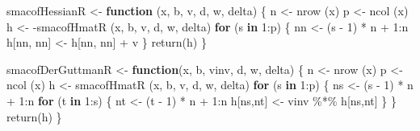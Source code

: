 \documentclass[
  12pt,
]{book}
\newenvironment{Shaded}{\begin{snugshade}}{\end{snugshade}}
\newcommand{\ControlFlowTok}[1]{\textcolor[rgb]{0.13,0.29,0.53}{\textbf{#1}}}
\newcommand{\DecValTok}[1]{\textcolor[rgb]{0.00,0.00,0.81}{#1}}
\newcommand{\FunctionTok}[1]{\textcolor[rgb]{0.00,0.00,0.00}{#1}}
\newcommand{\NormalTok}[1]{#1}
\newcommand{\OtherTok}[1]{\textcolor[rgb]{0.56,0.35,0.01}{#1}}
\newcommand{\SpecialCharTok}[1]{\textcolor[rgb]{0.00,0.00,0.00}{#1}}
\theoremstyle{definition}
\theoremstyle{definition}
\theoremstyle{definition}
\theoremstyle{definition}
\theoremstyle{remark}
\begin{document}
\begin{Shaded}
\begin{Highlighting}[]
\NormalTok{smacofHessianR }\OtherTok{\textless{}{-}} \ControlFlowTok{function}\NormalTok{ (x, b, v, d, w, delta) \{}
\NormalTok{  n }\OtherTok{\textless{}{-}} \FunctionTok{nrow}\NormalTok{ (x)}
\NormalTok{  p }\OtherTok{\textless{}{-}} \FunctionTok{ncol}\NormalTok{ (x)}
\NormalTok{  h }\OtherTok{\textless{}{-}} \SpecialCharTok{{-}}\FunctionTok{smacofHmatR}\NormalTok{ (x, b, v, d, w, delta)}
  \ControlFlowTok{for}\NormalTok{ (s }\ControlFlowTok{in} \DecValTok{1}\SpecialCharTok{:}\NormalTok{p) \{}
\NormalTok{    nn }\OtherTok{\textless{}{-}}\NormalTok{ (s }\SpecialCharTok{{-}} \DecValTok{1}\NormalTok{) }\SpecialCharTok{*}\NormalTok{ n }\SpecialCharTok{+} \DecValTok{1}\SpecialCharTok{:}\NormalTok{n}
\NormalTok{    h[nn, nn] }\OtherTok{\textless{}{-}}\NormalTok{ h[nn, nn] }\SpecialCharTok{+}\NormalTok{ v}
\NormalTok{  \}}
  \FunctionTok{return}\NormalTok{(h)}
\NormalTok{\}}

\NormalTok{smacofDerGuttmanR }\OtherTok{\textless{}{-}} \ControlFlowTok{function}\NormalTok{(x, b, vinv, d, w, delta) \{}
\NormalTok{  n }\OtherTok{\textless{}{-}} \FunctionTok{nrow}\NormalTok{ (x)}
\NormalTok{  p }\OtherTok{\textless{}{-}} \FunctionTok{ncol}\NormalTok{ (x)}
\NormalTok{  h }\OtherTok{\textless{}{-}} \FunctionTok{smacofHmatR}\NormalTok{ (x, b, v, d, w, delta)}
  \ControlFlowTok{for}\NormalTok{ (s }\ControlFlowTok{in} \DecValTok{1}\SpecialCharTok{:}\NormalTok{p) \{}
\NormalTok{    ns }\OtherTok{\textless{}{-}}\NormalTok{ (s }\SpecialCharTok{{-}} \DecValTok{1}\NormalTok{) }\SpecialCharTok{*}\NormalTok{ n }\SpecialCharTok{+} \DecValTok{1}\SpecialCharTok{:}\NormalTok{n}
    \ControlFlowTok{for}\NormalTok{ (t }\ControlFlowTok{in} \DecValTok{1}\SpecialCharTok{:}\NormalTok{s) \{}
\NormalTok{      nt }\OtherTok{\textless{}{-}}\NormalTok{ (t }\SpecialCharTok{{-}} \DecValTok{1}\NormalTok{) }\SpecialCharTok{*}\NormalTok{ n }\SpecialCharTok{+} \DecValTok{1}\SpecialCharTok{:}\NormalTok{n}
\NormalTok{      h[ns,nt] }\OtherTok{\textless{}{-}}\NormalTok{ vinv }\SpecialCharTok{\%*\%}\NormalTok{ h[ns,nt]}
\NormalTok{    \}}
\NormalTok{  \}}
  \FunctionTok{return}\NormalTok{(h)}
\NormalTok{\}}


\end{Highlighting}
\end{Shaded}
\end{document}
